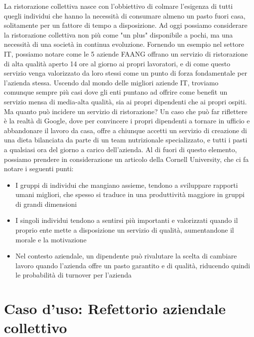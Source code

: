 \documentclass[a4paper, titlepage, 12pt, openright, twoside]{book}
\begin{document}
La ristorazione collettiva nasce con l'obbiettivo di colmare l'esigenza di tutti quegli individui
che hanno la necessità di consumare almeno un pasto fuori casa, solitamente per un fattore di tempo a disposizione.
Ad oggi possiamo considerare la ristorazione collettiva non più come "un plus" disponibile a pochi, ma una necessità di una società in continua evoluzione.
Fornendo un esempio nel settore IT, possiamo notare come le 5 aziende FAANG offrano un servizio di ristorazione di alta qualità aperto 14 ore al giorno ai propri lavoratori,
e di come questo servizio venga valorizzato da loro stessi come un punto di forza fondamentale per l'azienda stessa.
\newline
Uscendo dal mondo delle migliori aziende IT, troviamo comunque sempre più casi dove gli enti puntano ad offrire come benefit un servizio mensa di media-alta qualità,
sia ai propri dipendenti che ai propri ospiti.
\newline
Ma quanto può incidere un servizio di ristorazione?
\newline
Un caso che può far riflettere è la realtà di Google, dove per convincere i propri dipendenti a tornare in ufficio e abbandonare il lavoro da casa,
offre a chiunque accetti un servizio di creazione di una dieta bilanciata da parte di un team nutrizionale specializzato, e tutti i pasti a qualsiasi ora del giorno a carico dell'azienda.
Al di fuori di questo elemento, possiamo prendere in considerazione un articolo della Cornell University, che ci fa notare i seguenti punti:
\begin{itemize}
	\item I gruppi di individui che mangiano assieme, tendono a sviluppare rapporti umani migliori, che spesso si traduce in una produttività maggiore in gruppi di grandi dimensioni
	\item I singoli individui tendono a sentirsi più importanti e valorizzati quando il proprio ente mette a disposizione un servizio di qualità, aumentandone il morale e la motivazione
	\item Nel contesto aziendale, un dipendente può rivalutare la scelta di cambiare lavoro quando l'azienda offre un pasto garantito e di qualità,
			riducendo quindi le probabilità di turnover per l'azienda
\end{itemize}

\chapter{Caso d'uso: Refettorio aziendale collettivo}\label{chap:caso}
\end{document}
